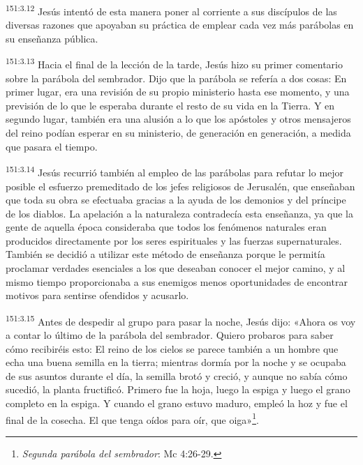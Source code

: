 \par 
\textsuperscript{151:3.12} Jesús intentó de esta manera poner al corriente a sus discípulos de las diversas razones que apoyaban su práctica de emplear cada vez más parábolas en su enseñanza pública.

\par 
\textsuperscript{151:3.13} Hacia el final de la lección de la tarde, Jesús hizo su primer comentario sobre la parábola del sembrador. Dijo que la parábola se refería a dos cosas: En primer lugar, era una revisión de su propio ministerio hasta ese momento, y una previsión de lo que le esperaba durante el resto de su vida en la Tierra. Y en segundo lugar, también era una alusión a lo que los apóstoles y otros mensajeros del reino podían esperar en su ministerio, de generación en generación, a medida que pasara el tiempo.

\par 
\textsuperscript{151:3.14} Jesús recurrió también al empleo de las parábolas para refutar lo mejor posible el esfuerzo premeditado de los jefes religiosos de Jerusalén, que enseñaban que toda su obra se efectuaba gracias a la ayuda de los demonios y del príncipe de los diablos. La apelación a la naturaleza contradecía esta enseñanza, ya que la gente de aquella época consideraba que todos los fenómenos naturales eran producidos directamente por los seres espirituales y las fuerzas supernaturales. También se decidió a utilizar este método de enseñanza porque le permitía proclamar verdades esenciales a los que deseaban conocer el mejor camino, y al mismo tiempo proporcionaba a sus enemigos menos oportunidades de encontrar motivos para sentirse ofendidos y acusarlo.

\par 
\textsuperscript{151:3.15} Antes de despedir al grupo para pasar la noche, Jesús dijo: «Ahora os voy a contar lo último de la parábola del sembrador. Quiero probaros para saber cómo recibiréis esto: El reino de los cielos se parece también a un hombre que echa una buena semilla en la tierra; mientras dormía por la noche y se ocupaba de sus asuntos durante el día, la semilla brotó y creció, y aunque no sabía cómo sucedió, la planta fructificó. Primero fue la hoja, luego la espiga y luego el grano completo en la espiga. Y cuando el grano estuvo maduro, empleó la hoz y fue el final de la cosecha. El que tenga oídos para oír, que oiga»\footnote{\textit{Segunda parábola del sembrador}: Mc 4:26-29.}.

